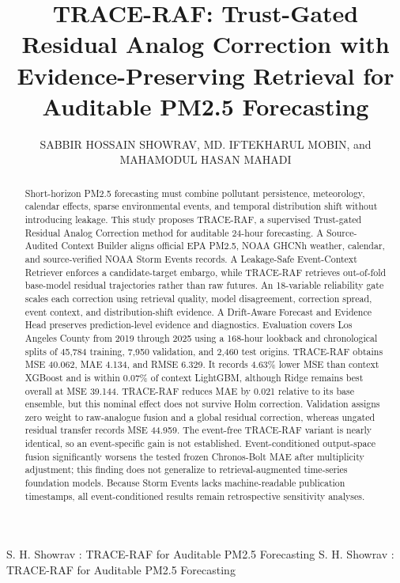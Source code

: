 \documentclass{ieeeaccess}
\begin{document}
\history{}
\doi{}

\title{TRACE-RAF: Trust-Gated Residual Analog Correction with Evidence-Preserving Retrieval for Auditable PM2.5 Forecasting}

\author{\uppercase{Sabbir Hossain Showrav},
\uppercase{Md. Iftekharul Mobin}, and
\uppercase{Mahamodul Hasan Mahadi}}

\address[1]{Department of Computer Science, Faculty of Science and Technology,
American International University-Bangladesh, Dhaka 1229, Bangladesh}

\markboth
{S. H. Showrav \headeretal: TRACE-RAF for Auditable PM2.5 Forecasting}
{S. H. Showrav \headeretal: TRACE-RAF for Auditable PM2.5 Forecasting}


\begin{abstract}
Short-horizon PM2.5 forecasting must combine pollutant persistence,
meteorology, calendar effects, sparse environmental events, and temporal
distribution shift without introducing leakage. This study proposes TRACE-RAF,
a supervised Trust-gated Residual Analog Correction method for auditable
24-hour forecasting. A Source-Audited Context Builder aligns official EPA
PM2.5, NOAA GHCNh weather, calendar, and source-verified NOAA Storm Events
records. A Leakage-Safe Event-Context Retriever enforces a candidate-target
embargo, while TRACE-RAF retrieves out-of-fold base-model residual trajectories
rather than raw futures. An 18-variable reliability gate scales each correction
using retrieval quality, model disagreement, correction spread, event context,
and distribution-shift evidence. A Drift-Aware Forecast and Evidence Head
preserves prediction-level evidence and diagnostics. Evaluation covers Los Angeles County from
2019 through 2025 using a 168-hour lookback and chronological splits of 45,784
training, 7,950 validation, and 2,460 test origins. TRACE-RAF obtains MSE
40.062, MAE 4.134, and RMSE 6.329. It records 4.63\% lower MSE than context
XGBoost and is within 0.07\% of context LightGBM, although Ridge remains best
overall at MSE 39.144. TRACE-RAF reduces MAE by 0.021 relative to its base
ensemble, but this nominal effect does not survive Holm correction. Validation
assigns zero weight to raw-analogue fusion and a global residual correction,
whereas ungated residual transfer records MSE 44.959. The event-free TRACE-RAF
variant is nearly identical, so an event-specific gain is not established.
Event-conditioned output-space fusion significantly worsens the tested frozen
Chronos-Bolt MAE after multiplicity adjustment; this finding does not
generalize to retrieval-augmented time-series foundation models. Because Storm
Events lacks machine-readable publication timestamps, all event-conditioned
results remain retrospective sensitivity analyses.
\end{abstract}
\end{document}
